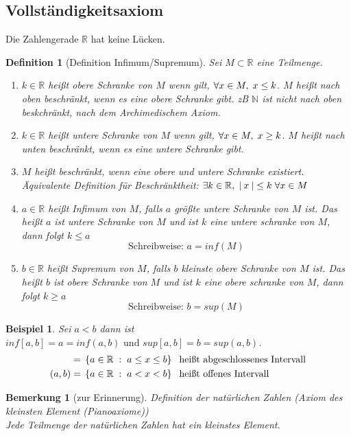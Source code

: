 \documentclass[a4paper,titlepage,oneside]{article}
\def\N{\ensuremath{\mathbb{N}} }
\def\R{\ensuremath{\mathbb{R}} }
\def\fa{\ensuremath{\forall}}
\def\sp{\hspace{0,1cm}}
\newcommand{\abs}[1]{\ensuremath{\left|\:#1\:\right|}}
\newcommand{\menge}[2]{\ensuremath{\left\{#1\sp : \sp #2\right\}}}
\theoremstyle{thmstyle}
\theoremstyle{subthmstyle}
\newtheorem{subdefi}[subsatz]{Definition}
\newtheorem{subbsp}[subsatz]{Beispiel}
\newtheorem{subbem}[subsatz]{Bemerkung}
\begin{document}
\subsection{Vollständigkeitsaxiom}
Die Zahlengerade \R hat keine Lücken.

\begin{subdefi}[Definition Infimum/Supremum]
Sei \(M \subset \R\) eine Teilmenge.
\begin{enumerate}
	\item \(k \in \R\) heißt obere Schranke von \(M\) wenn gilt, \(\fa x \in M,\sp x \le k\). \(M\) heißt nach oben beschränkt,
		wenn es eine obere Schranke gibt. zB \N ist nicht nach oben beskchränkt, nach dem Archimedischem Axiom.
	\item \(k \in \R \) heißt untere Schranke von \(M\) wenn gilt, \(\fa x \in M,\sp x \ge k\). \(M\) heißt nach unten beschränkt,
		wenn es eine untere Schranke gibt.
	\item \(M\) heißt beschränkt, wenn eine obere und untere Schranke existiert.  Äquivalente Definition für Beschränktheit:
		\(\exists k \in \R,\sp \abs{x} \le k \sp \fa x \in M\)
	\item \(a \in \R\) heißt Infimum von \(M\), falls \(a\) größte untere Schranke von \(M\) ist. Das heißt \(a\) ist untere Schranke
		von \(M\) und ist \(k\) eine untere schranke von \(M\), dann folgt \(k \le a\)
		\[\text{Schreibweise: } a = inf(M)\]
	\item \(b \in \R\) heißt Supremum von \(M\), falls \(b\) kleinste obere Schranke von \(M\) ist. Das heißt \(b\) ist obere
		Schranke von \(M\) und ist \(k\) eine obere schranke von \(M\), dann folgt \(k \ge a\) \[\text{Schreibweise: } b = sup(M)\]
\end{enumerate}
\end{subdefi}

\begin{subbsp}
Sei \(a < b\) dann ist \(inf[a,b] = a = inf(a,b) \text{ und } sup[a,b] = b = sup(a,b)\).
\begin{align*}
[a, b] = &\sp \menge{a \in \R}{a \le x \le b} \sp \text{ heißt abgeschlossenes Intervall}\\
(a, b) = &\sp \menge{a \in \R}{a < x < b} \sp \text{ heißt offenes Intervall}
\end{align*}
\end{subbsp}

\begin{subbem}[zur Erinnerung]
Definition der natürlichen Zahlen (Axiom des kleinsten Element (Pianoaxiome)) \\
Jede Teilmenge der natürlichen Zahlen hat ein kleinstes Element.
\end{subbem}
\end{document}

